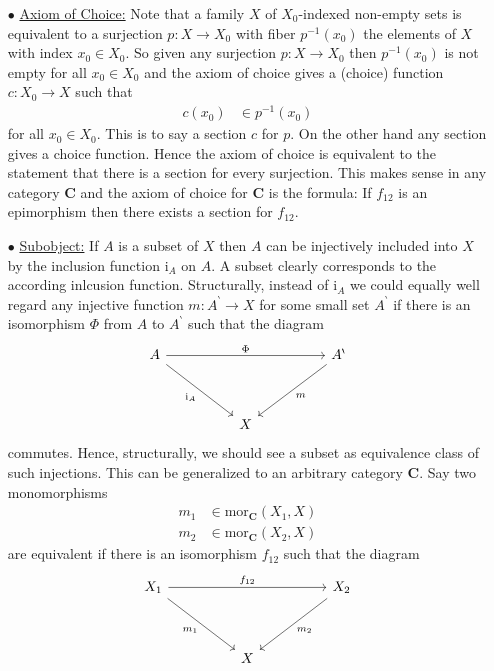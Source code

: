 \begin{exa}
\begin{enumerate}
\item[$\bullet$]
\underline{Axiom of Choice:}
Note that a family $X$ of $X_{0}$-indexed non-empty sets is equivalent to a surjection $p \colon X \rightarrow X_{0}$ with fiber $p^{-1}(x_{0})$ the elements of $X$ with index $x_{0} \in X_{0}$. So given any surjection $p \colon X \rightarrow X_{0}$ then $p^{-1}(x_{0})$ is not empty for all $x_{0} \in X_{0}$ and the axiom of choice gives a (choice) function $c \colon X_{0} \rightarrow X$ such that
\begin{align*}
  c(x_{0})
  &\in
  p^{-1}(x_{0})
\end{align*}
for all $x_{0} \in X_{0}$. This is to say a section $c$ for $p$. On the other hand any section gives a choice function. Hence the axiom of choice is equivalent to the statement that there is a section for every surjection. This makes sense in any category $\mathbf{C}$ and the axiom of choice for $\mathbf{C}$ is the formula: If $f_{12}$ is an epimorphism then there exists a section for $f_{12}$.
\item[$\bullet$]
\underline{Subobject:}
If $A$ is a subset of $X$ then $A$ can be injectively included into $X$ by the inclusion function $\mathrm{i}_{A}$ on $A$. A subset clearly corresponds to the according inlcusion function. Structurally, instead of $\mathrm{i}_{A}$ we could equally well regard any injective function $m \colon A^{\backprime} \rightarrow X$ for some small set $A^{\backprime}$ if there is an isomorphism $\Phi$ from $A$ to $A^{\backprime}$ such that the diagram
\[
\begin{tikzcd}[sep=huge]
  A
  \arrow{rr}{\Phi}
  \arrow[swap]{rd}{\mathrm{i}_{A}}
  &
  &
  A^{\backprime}
  \arrow{dl}{m}
  \\
  &
  X
\end{tikzcd}
\]
commutes. Hence, structurally, we should see a subset as equivalence class of such injections. This can be generalized to an arbitrary category $\mathbf{C}$. Say two monomorphisms
\begin{align*}
  m_{1}
  &\in
  \mathrm{mor}_{\mathbf{C}}(X_{1},X)
  \\
  m_{2}
  &\in
  \mathrm{mor}_{\mathbf{C}}(X_{2},X)
\end{align*}
are equivalent if there is an isomorphism $f_{12}$ such that the diagram
\[
\begin{tikzcd}[sep=huge]
  X_{1}
  \arrow{rr}{f_{12}}
  \arrow[swap]{rd}{m_{1}}
  &
  &
  X_{2}
  \arrow{dl}{m_{2}}
  \\
  &
  X
\end{tikzcd}
\]
\end{enumerate}
\end{exa}
